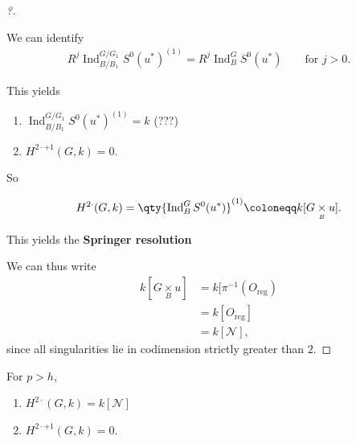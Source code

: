 \begin{proof}[?]

\begin{fact}

We can identify
\begin{align*}  
R^j \operatorname{Ind}_{B/B_1}^{G/G_1} S^0(u^*)^{(1)} = R^j \operatorname{Ind}_B^G S^0(u^*) \qquad \text{for } j>0
.\end{align*}

\end{fact}

This yields

\begin{enumerate}
\def\labelenumi{\arabic{enumi}.}
\item
  \(\operatorname{Ind}_{B/B_1}^{G/G_1} S^0(u^*)^{(1)} = k\) (???)
\item
  \(H^{2\cdot+1}(G, k) = 0\).
\end{enumerate}

So

\begin{align*}  
H^{2\cdot}(G, k) = \qty{ \operatorname{Ind}_B^G S^0(u^*)  }^{(1)} \coloneqq k[G \underset{\scriptscriptstyle {B} }{\times} u]
.\end{align*}

This yields the \textbf{Springer resolution}

\begin{center}
\end{center}

We can thus write
\begin{align*}  
k[G\underset{\scriptscriptstyle {B} }{\times} u] 
&= k[ \pi^{-1}(O_{\text{reg}}) \\
&= k[O_{\text{reg}}] \\
&= k[\mathcal{N}]
,\end{align*}
since all singularities lie in codimension strictly greater than \(2\).

\end{proof}

\begin{theorem}[F-P, A-J, 1980s]

For \(p>h\),

\begin{enumerate}
\def\labelenumi{\arabic{enumi}.}
\tightlist
\item
  \(H^{2\cdot }(G, k) = k[{\mathcal{N}}]\)
\item
  \(H^{2\cdot + 1}(G, k) = 0\).
\end{enumerate}

\end{theorem}

